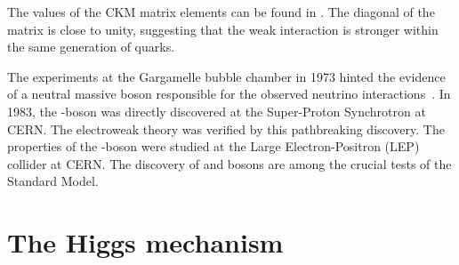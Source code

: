 The values of the CKM matrix elements can be found in \cite{pdg2024}. The diagonal
of the matrix is close to unity, suggesting that the weak interaction is stronger within
the same generation of quarks. 

The experiments at the Gargamelle bubble chamber in 1973 hinted the evidence of a neutral
massive boson responsible for the observed neutrino interactions~\cite{HASERT1973138}. In 1983, the \PZ-boson
was directly discovered at the Super-Proton Synchrotron at CERN. The electroweak theory
was verified by this pathbreaking discovery. The properties of the \PZ-boson were
studied at the Large Electron-Positron (LEP) collider at CERN. The discovery of \PZ and \PW 
bosons are among the crucial tests of the Standard Model. 







\section{The Higgs mechanism}




















